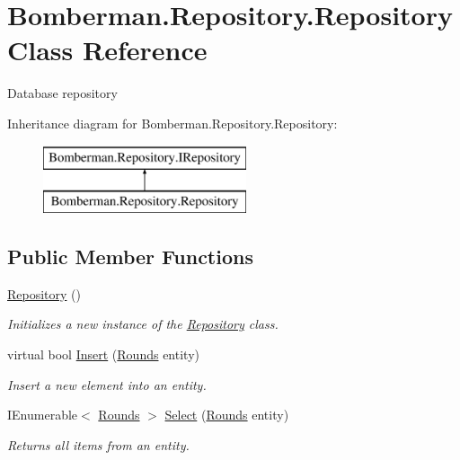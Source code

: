 \hypertarget{class_bomberman_1_1_repository_1_1_repository}{}\section{Bomberman.\+Repository.\+Repository Class Reference}
\label{class_bomberman_1_1_repository_1_1_repository}


Database repository  


Inheritance diagram for Bomberman.\+Repository.\+Repository\+:\begin{figure}[H]
\begin{center}
\leavevmode
\includegraphics[height=2.000000cm]{class_bomberman_1_1_repository_1_1_repository}
\end{center}
\end{figure}
\subsection*{Public Member Functions}
\begin{DoxyCompactItemize}
\item 
\mbox{\hyperlink{class_bomberman_1_1_repository_1_1_repository_aec1133214e470bf4e1f49fb97aa07870}{Repository}} ()
\begin{DoxyCompactList}\small\item\em Initializes a new instance of the \mbox{\hyperlink{class_bomberman_1_1_repository_1_1_repository}{Repository}} class. \end{DoxyCompactList}\item 
virtual bool \mbox{\hyperlink{class_bomberman_1_1_repository_1_1_repository_a3374580de7f0c6859a95e87813d85983}{Insert}} (\mbox{\hyperlink{class_bomberman_1_1_data_1_1_rounds}{Rounds}} entity)
\begin{DoxyCompactList}\small\item\em Insert a new element into an entity. \end{DoxyCompactList}\item 
I\+Enumerable$<$ \mbox{\hyperlink{class_bomberman_1_1_data_1_1_rounds}{Rounds}} $>$ \mbox{\hyperlink{class_bomberman_1_1_repository_1_1_repository_a3853a77eda150ba9389082a7315413f1}{Select}} (\mbox{\hyperlink{class_bomberman_1_1_data_1_1_rounds}{Rounds}} entity)
\begin{DoxyCompactList}\small\item\em Returns all items from an entity. \end{DoxyCompactList}\end{DoxyCompactItemize}
